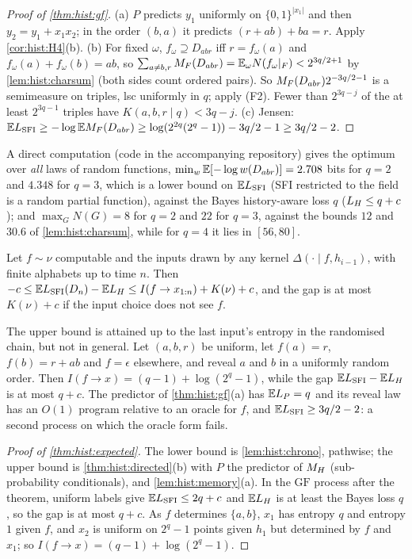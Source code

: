 \begin{proof}[Proof of \cref{thm:hist:gf}]
(a) $P$ predicts $y_1$ uniformly on $\{0,1\}^{|x_1|}$ and then $y_2=y_1+x_1x_2$; in the order $(b,a)$ it predicts $(r+ab)+ba=r$. Apply \cref{cor:hist:H4}(b). (b) For fixed $\omega$, $f_\omega\supseteq D_{abr}$ iff $r=f_\omega(a)$ and $f_\omega(a)+f_\omega(b)=ab$, so $\sum_{a\ne b,r}M_{F}(D_{abr})=\mathbb{E}_\omega N(f_\omega|_F)<2^{3q/2+1}$ by \cref{lem:hist:charsum} (both sides count ordered pairs). So $M_{F}(D_{abr})2^{-3q/2-1}$ is a semimeasure on triples, lsc uniformly in $q$; apply (F2). Fewer than $2^{3q-j}$ of the at least $2^{3q-1}$ triples have $K(a,b,r\mid q)<3q-j$. (c) Jensen: $\mathbb{E}L_{\mathrm{SFI}}\ge-\log\mathbb{E}M_{F}(D_{abr})\ge\log(2^{2q}(2^q-1))-3q/2-1\ge3q/2-2$.
\end{proof}

A direct computation (code in the accompanying repository) gives the optimum over \emph{all} laws of random functions, $\min_w\mathbb{E}[-\log w(D_{abr})]=2.708$ bits for $q=2$ and $4.348$ for $q=3$, which is a lower bound on $\mathbb{E}L_{\mathrm{SFI}}$ (SFI restricted to the field is a random partial function), against the Bayes history-aware loss $q$ ($L_{H}\le q+c$); and $\max_GN(G)=8$ for $q=2$ and $22$ for $q=3$, against the bounds $12$ and $30.6$ of \cref{lem:hist:charsum}, while for $q=4$ it lies in $[56,80]$.

\begin{theorem}\label{thm:hist:expected}
Let $f\sim\nu$ computable and the inputs drawn by any kernel $\Delta(\cdot\mid f,h_{i-1})$, with finite alphabets up to time $n$. Then $-c\le\mathbb{E}L_{\mathrm{SFI}}(D_n)-\mathbb{E}L_{H}\le I(f\to x_{1:n})+K(\nu)+c$, and the gap is at most $K(\nu)+c$ if the input choice does not see $f$.
\end{theorem}

The upper bound is attained up to the last input's entropy in the randomised chain, but not in general. Let $(a,b,r)$ be uniform, let $f(a)=r$, $f(b)=r+ab$ and $f=\epsilon$ elsewhere, and reveal $a$ and $b$ in a uniformly random order. Then $I(f\to x)=(q-1)+\log(2^q-1)$, while the gap $\mathbb{E}L_{\mathrm{SFI}}-\mathbb{E}L_{H}$ is at most $q+c$. The predictor of \cref{thm:hist:gf}(a) has $\mathbb{E} L_P=q$ and its reveal law has an $O(1)$ program relative to an oracle for $f$, and $\mathbb{E}L_{\mathrm{SFI}}\ge3q/2-2$: a second process on which the oracle form fails.

\begin{proof}[Proof of \cref{thm:hist:expected}]
The lower bound is \cref{lem:hist:chrono}, pathwise; the upper bound is \cref{thm:hist:directed}(b) with $P$ the predictor of $M_{H}$ (sub-probability conditionals), and \cref{lem:hist:memory}(a). In the $\mathrm{GF}$ process after the theorem, uniform labels give $\mathbb{E}L_{\mathrm{SFI}}\le2q+c$ and $\mathbb{E}L_{H}$ is at least the Bayes loss $q$, so the gap is at most $q+c$. As $f$ determines $\{a,b\}$, $x_1$ has entropy $q$ and entropy $1$ given $f$, and $x_2$ is uniform on $2^q-1$ points given $h_1$ but determined by $f$ and $x_1$; so $I(f\to x)=(q-1)+\log(2^q-1)$.
\end{proof}

